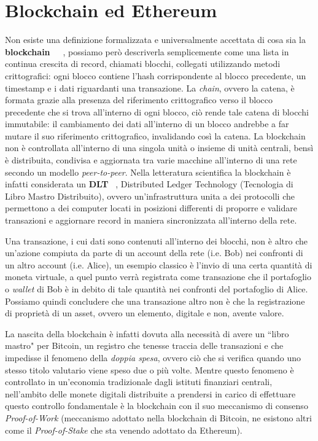 \section{Blockchain ed Ethereum}
\label{sub:bc}
Non esiste una definizione formalizzata e universalmente accettata di cosa sia la
\textbf{blockchain}~\cite{block1}~\cite{block2}~\cite{block3}, possiamo però descriverla semplicemente come una lista in continua 
crescita di record, chiamati blocchi, collegati utilizzando metodi crittografici: 
ogni blocco contiene l'hash corrispondente al blocco precedente, un timestamp e i 
dati riguardanti una transazione. 
La \emph{chain}, ovvero la catena, è formata grazie alla presenza del riferimento 
crittografico verso il blocco precedente che si trova all'interno di ogni blocco, 
ciò rende tale catena di blocchi immutabile: il cambiamento dei dati all'interno di 
un blocco andrebbe a far mutare il suo riferimento crittografico, invalidando così la catena.
La blockchain non è controllata all'interno di una singola unità o insieme di 
unità centrali, bensì è distribuita, condivisa e aggiornata tra varie macchine 
all'interno di una rete secondo un modello \emph{peer-to-peer}.
Nella letteratura scientifica la blockchain è infatti considerata un \textbf{DLT} ~\cite{asv-bdg-19},
Distributed Ledger Technology (Tecnologia di Libro Mastro Distribuito), ovvero
un'infrastruttura unita a dei protocolli che permettono a dei computer locati in
posizioni differenti di proporre e validare transazioni e aggiornare record in maniera
sincronizzata all'interno della rete.

Una transazione, i cui dati sono contenuti all'interno dei blocchi, non è 
altro che un'azione compiuta da parte di un account della rete (i.e. Bob) nei confronti 
di un altro account (i.e. Alice), un esempio classico è l'invio di una certa quantità di moneta 
virtuale, a quel punto verrà registrata come transazione che il portafoglio o \emph{wallet}
di Bob è in debito di tale quantità nei confronti del portafoglio di Alice.
Possiamo quindi concludere che una transazione altro non è che la registrazione di proprietà 
di un asset, ovvero un elemento, digitale e non, avente valore.

La nascita della blockchain è infatti dovuta alla necessità di avere un ``libro mastro" per 
Bitcoin, un registro che tenesse traccia delle transazioni e che impedisse il fenomeno della 
\emph{doppia spesa}, ovvero ciò che si verifica quando uno stesso titolo valutario viene speso 
due o più volte. Mentre questo fenomeno è controllato in un'economia tradizionale dagli 
istituti finanziari centrali, nell'ambito delle monete digitali distribuite a prendersi 
in carico di effettuare questo controllo fondamentale è la blockchain con il suo 
meccanismo di consenso \emph{Proof-of-Work} 
(meccanismo adottato nella blockchain di Bitcoin, 
ne esistono altri come il \emph{Proof-of-Stake} che sta venendo adottato da Ethereum).

